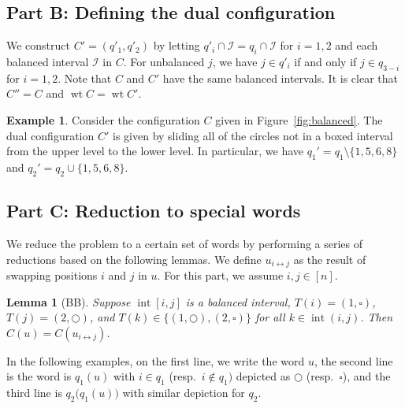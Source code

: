 \documentclass[submission]{FPSAC2018}
\DeclareMathOperator{\inter}{int} %
\DeclareMathOperator{\wt}{wt} %
\newcommand{\mcI}{\mathcal{I}}
\newcommand{\ive}[1]{\left[ #1 \right]}
\theoremstyle{plain}
\newtheorem{lemma}[thm]{Lemma}
\theoremstyle{definition}
\newtheorem{example}[thm]{Example}
\numberwithin{equation}{section}
\begin{document}
\subsection*{Part B: Defining the dual configuration}

We construct $C' = (q'_1, q'_2)$ by letting $q'_i \cap \mcI = q_i \cap \mcI$ for $i=1,2$ and each balanced interval $\mcI$ in $C$.
For unbalanced $j$, we have $j \in q'_i$ if and only if $j \in q_{3-i}$ for $i = 1,2$.
Note that $C$ and $C'$ have the same balanced intervals.
It is clear that $C'' = C$ and $\wt C = \wt C'$.

\begin{example}
Consider the configuration $C$ given in Figure~\ref{fig:balanced}.
The dual configuration $C'$ is given by sliding all of the circles not in a boxed interval from the upper level to the lower level.
In particular, we have $q_1' = q_1 \setminus \{1,5,6,8\}$ and $q_2' = q_2 \cup \{1,5,6,8\}$.
\end{example}

\subsection*{Part C: Reduction to special words}

We reduce the problem to a certain set of words by performing a series of reductions based on the following lemmas.
We define $u_{i\leftrightarrow j}$ as the result of swapping positions $i$ and $j$ in $u$.
For this part, we assume $i,j \in \ive{n}$.


\begin{lemma}[BB]
\label{le:BB}
  Suppose $\inter[i,j]$ is a balanced interval, $T(i) = (1,\square)$, $T(j) = (2,\bigcirc)$, and $T(k) \in \{(1,\bigcirc),(2,\square)\}$ for all $k \in \inter(i,j)$.
  Then $C(u) = C(u_{i \leftrightarrow j})$.
\end{lemma}

In the following examples, on the first line, we write the word $u$, the second line is the word is $q_1(u)$ with $i \in q_1$ (resp.~$i \notin q_1)$ depicted as $\bigcirc$ (resp.~$\square$), and the third line is $q_2\big(q_1(u)\bigr)$ with similar depiction for $q_2$.
\end{document}
